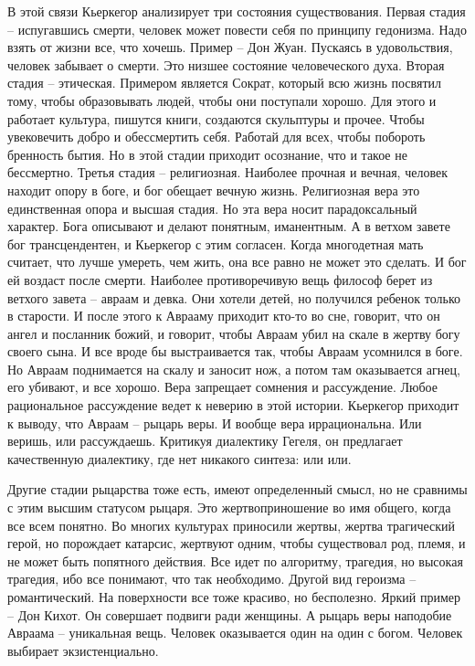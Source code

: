 \documentclass[a4paper, 12pt]{article}
\begin{document}
В этой связи Кьеркегор анализирует три состояния существования. Первая стадия -- испугавшись смерти, человек может повести себя по принципу гедонизма. Надо взять от жизни все, что хочешь. Пример -- Дон Жуан. Пускаясь в удовольствия, человек забывает о смерти. Это низшее состояние человеческого духа. Вторая стадия -- этическая. Примером является Сократ, который всю жизнь посвятил тому, чтобы образовывать людей, чтобы они поступали хорошо. Для этого и работает культура, пишутся книги, создаются скульптуры и прочее. Чтобы увековечить добро и обессмертить себя. Работай для всех, чтобы побороть бренность бытия. Но в этой стадии приходит осознание, что и такое не бессмертно. Третья стадия -- религиозная. Наиболее прочная и вечная, человек находит опору в боге, и бог обещает вечную жизнь. Религиозная вера это единственная опора и высшая стадия. Но эта вера носит парадоксальный характер. Бога описывают и делают понятным, иманентным. А в ветхом завете бог трансцендентен, и Кьеркегор с этим согласен. Когда многодетная мать считает, что лучше умереть, чем жить, она все равно не может это сделать. И бог ей воздаст после смерти. Наиболее противоречивую вещь философ берет из ветхого завета -- авраам и девка. Они хотели детей, но получился ребенок только в старости. И после этого к Аврааму приходит кто-то во сне, говорит, что он ангел и посланник божий, и говорит, чтобы Авраам убил на скале в жертву богу своего сына. И все вроде бы выстраивается так, чтобы Авраам усомнился в боге. Но Авраам поднимается на скалу и заносит нож, а потом там оказывается агнец, его убивают, и все хорошо. Вера запрещает сомнения и рассуждение. Любое рациональное рассуждение ведет к неверию в этой истории. Кьеркегор приходит к выводу, что Авраам -- рыцарь веры. И вообще вера иррациональна. Или веришь, или рассуждаешь. Критикуя диалектику Гегеля, он предлагает качественную диалектику, где нет никакого синтеза: или или. 

Другие стадии рыцарства тоже есть, имеют определенный смысл, но не сравнимы с этим высшим статусом рыцаря. Это жертвоприношение во имя общего, когда все всем понятно. Во многих культурах приносили жертвы, жертва трагический герой, но порождает катарсис, жертвуют одним, чтобы существовал род, племя, и не может быть попятного действия. Все идет по алгоритму, трагедия, но высокая трагедия, ибо все понимают, что так необходимо. Другой вид героизма -- романтический. На поверхности все тоже красиво, но бесполезно. Яркий пример -- Дон Кихот. Он совершает подвиги ради женщины. А рыцарь веры наподобие Авраама -- уникальная вещь. Человек оказывается один на один с богом. Человек выбирает экзистенциально. 
\end{document}
